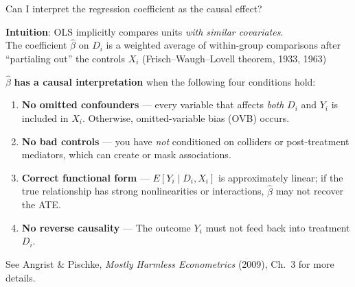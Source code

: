 \documentclass[aspectratio=169, 12pt]{beamer}
\newcommand{\redt}[1]{\textcolor{emphred}{#1}}
\begin{document}
\begin{frame}{Can I interpret the regression coefficient as the causal effect?}

\textbf{Intuition}: OLS implicitly compares units \emph{with similar covariates}.\\[0.3em]
The coefficient $\hat\beta$ on $D_i$ is a \redt{weighted average of within-group comparisons}
after ``partialing out'' the controls $X_i$ (Frisch--Waugh--Lovell theorem, 1933, 1963)

\vspace{0.6em}
$\hat\beta$ \textbf{has a causal interpretation} when the following \redt{four conditions} hold:
\begin{enumerate}\setlength\itemsep{0.3em}
  \item \textbf{No omitted confounders} --- every variable that affects \emph{both} $D_i$ and $Y_i$ is
    included in $X_i$.  Otherwise, \redt{omitted-variable bias} (OVB) occurs.
  \item \textbf{No bad controls} --- you have \emph{not} conditioned on colliders or post-treatment mediators, which can \redt{create or mask} associations.
  \item \textbf{Correct functional form} --- $E[Y_i \mid D_i, X_i]$ is approximately linear; if the true relationship has strong nonlinearities or interactions, $\hat\beta$ may not recover the ATE.
  \item \textbf{No reverse causality} --- The outcome $Y_i$ must not feed back into treatment $D_i$.
\end{enumerate}

\vspace{-0.2em}
\begin{footnotesize}See Angrist \& Pischke, \textit{Mostly Harmless Econometrics} (2009), Ch.\ 3 for more details.\end{footnotesize}

\end{frame}
\end{document}
